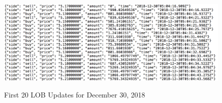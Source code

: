 \begin{figure}[t]
\begin{center}
\caption{First 20 LOB Updates for December 30, 2018}
\includegraphics[width=\textwidth]{Figures/12_30_18_Updates.png}
\label{fig:12_30_18_Updates}
\end{center}
\end{figure}


